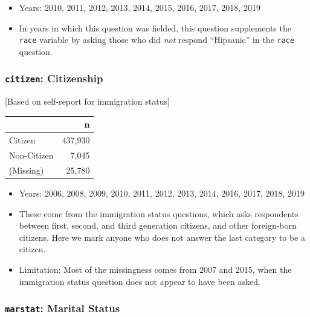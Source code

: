 \documentclass[10pt,article,oneside]{memoir}
\theoremstyle{definition}
\begin{document}
\begin{itemize}
\tightlist
\item
  Years: 2010, 2011, 2012, 2013, 2014, 2015, 2016, 2017, 2018, 2019
\item
  In years in which this question was fielded, this question supplements
  the \texttt{race} variable by asking those who did \emph{not} respond
  ``Hipsanic'' in the \texttt{race} question.
\end{itemize}

\hypertarget{citizen-citizenship}{%
\subsubsection{\texorpdfstring{\texttt{citizen}:
Citizenship}{citizen: Citizenship}}\label{citizen-citizenship}}

{[}Based on self-report for immigration status{]}

\begin{table}[H]
\centering
\begin{tabular}{lr}
\toprule
 & n\\
\midrule
Citizen & 437,930\\
Non-Citizen & 7,045\\
(Missing) & 25,780\\
\bottomrule
\end{tabular}
\end{table}

\begin{itemize}
\tightlist
\item
  Years: 2006, 2008, 2009, 2010, 2011, 2012, 2013, 2014, 2016, 2017,
  2018, 2019
\item
  These come from the immigration status questions, which asks
  respondents between first, second, and third generation citizens, and
  other foreign-born citizens. Here we mark anyone who does not answer
  the last category to be a citizen.
\item
  Limitation: Most of the missingness comes from 2007 and 2015, when the
  immigration status question does not appear to have been asked.
\end{itemize}

\hypertarget{marstat-marital-status}{%
\subsubsection{\texorpdfstring{\texttt{marstat}: Marital
Status}{marstat: Marital Status}}\label{marstat-marital-status}}
\end{document}
